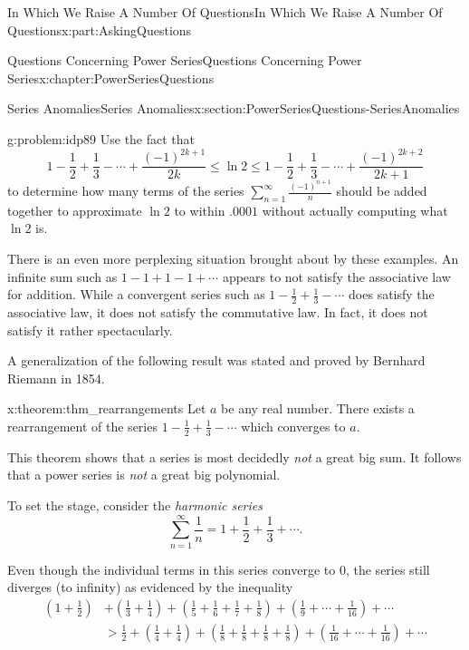 \documentclass[oneside,10pt,]{book}
\numberwithin{equation}{section}
\newcommand{\amp}{&}
\begin{document}
\begin{partptx}{In Which We Raise A Number Of Questions}{}{In Which We Raise A Number Of Questions}{}{}{x:part:AskingQuestions}
\begin{chapterptx}{Questions Concerning Power Series}{}{Questions Concerning Power Series}{}{}{x:chapter:PowerSeriesQuestions}
\begin{sectionptx}{Series Anomalies}{}{Series Anomalies}{}{}{x:section:PowerSeriesQuestions-SeriesAnomalies}
\begin{problem}{}{g:problem:idp89}%
 Use the fact that%
\begin{equation*}
1-\frac{1}{2}+\frac{1}{3}-\cdots+\frac{(-1)^{2k+1}}{2k}\leq\ln 2\leq 1-\frac{1}{2}+\frac{1}{3}-\cdots+\frac{(-1)^{2k+2}}{2k+1}
\end{equation*}
to determine how many terms of the series \(\sum_{n=1}^\infty\frac{(-1)^{n+1}}{n}\) should be added together to approximate \(\ln 2\) to within \(.0001\) without actually computing what \(\ln 2\) is.%
\end{problem}
There is an even more perplexing situation brought about by these examples. An infinite sum such as \(1-1+1-1+\cdots\) appears to not satisfy the associative law for addition. While a convergent series such as \(1-\frac{1}{2}+\frac{1}{3}-\cdots\) does satisfy the associative law, it does not satisfy the commutative law. In fact, it does not satisfy it rather spectacularly.%
\par
A generalization of the following result was stated and proved by Bernhard Riemann  in 1854.%
\begin{theorem}{}{}{x:theorem:thm_rearrangements}%
%
Let \(a\) be any real number. There exists a rearrangement of the series \(1-\frac{1}{2}+\frac{1}{3}-\cdots\) which converges to \(a\).%
\end{theorem}
This theorem shows that a series is most decidedly \emph{not} a great big sum. It follows that a power series is \emph{not} a great big polynomial.%
\par
To set the stage, consider the \emph{harmonic series} %
\begin{equation*}
\sum_{n=1}^\infty\frac{1}{n}=1+\frac{1}{2}+\frac{1}{3}+\cdots\text{.}
\end{equation*}
%
\par
Even though the individual terms in this series converge to \(0\), the series still diverges (to infinity) as evidenced by the inequality%
\begin{align*}
\left(1+\frac{1}{2}\right)\amp +\left(\frac{1}{3}+\frac{1}{4}\right)+\left(\frac{1}{5}+\frac{1}{6}+ \frac{1}{7}+\frac{1}{8}\right)+\left(\frac{1}{9}+\cdots+\frac{1}{16}\right)+\cdots\\
\amp >\frac{1}{2}+\left(\frac{1}{4}+\frac{1}{4}\right)+\left(\frac{1}{8}+ \frac{1}{8}+\frac{1}{8}+\frac{1}{8}\right)+\left(\frac{1}{16}+\cdots+\frac{1}{16}\right)+\cdots\\

\end{align*}
\end{sectionptx}
\end{chapterptx}
\end{partptx}
\end{document}
